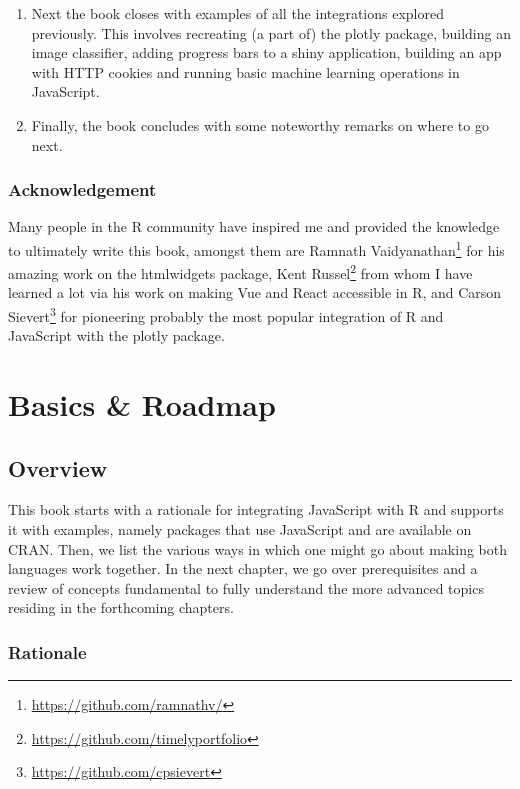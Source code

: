 \documentclass[
]{krantz}
\renewcommand{\href}[2]{#2\footnote{\url{#1}}}
\begin{document}
\begin{enumerate}
\item
  Next the book closes with examples of all the integrations explored previously. This involves recreating (a part of) the plotly package, building an image classifier, adding progress bars to a shiny application, building an app with HTTP cookies and running basic machine learning operations in JavaScript.
\item
  Finally, the book concludes with some noteworthy remarks on where to go next.
\end{enumerate}

\hypertarget{acknowledgement}{%
\section*{Acknowledgement}\label{acknowledgement}}


Many people in the R community have inspired me and provided the knowledge to ultimately write this book, amongst them are \href{https://github.com/ramnathv/}{Ramnath Vaidyanathan} for his amazing work on the htmlwidgets \citep{R-htmlwidgets} package, \href{https://github.com/timelyportfolio}{Kent Russel} from whom I have learned a lot via his work on making Vue and React accessible in R, and \href{https://github.com/cpsievert}{Carson Sievert} for pioneering probably the most popular integration of R and JavaScript with the plotly \citep{R-plotly} package.

\mainmatter

\hypertarget{part-basics-roadmap}{%
\part{Basics \& Roadmap}\label{part-basics-roadmap}}

\hypertarget{intro-overview}{%
\chapter{Overview}\label{intro-overview}}

This book starts with a rationale for integrating JavaScript with R and supports it with examples, namely packages that use JavaScript and are available on CRAN. Then, we list the various ways in which one might go about making both languages work together. In the next chapter, we go over prerequisites and a review of concepts fundamental to fully understand the more advanced topics residing in the forthcoming chapters.

\hypertarget{intro-overview-rationale}{%
\section{Rationale}\label{intro-overview-rationale}}
\end{document}
